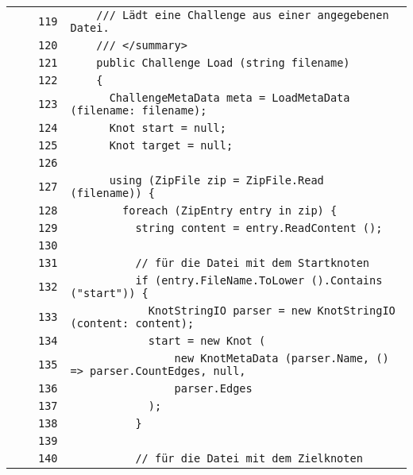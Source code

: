 \documentclass[a4paper,10pt]{article}
\begin{document}
\begin{longtable}[l]{lrrl}
\cellcolor{gray} &  & \verb~119~ & \verb~    /// Lädt eine Challenge aus einer angegebenen Datei.~\\
\cellcolor{gray} &  & \verb~120~ & \verb~    /// </summary>~\\
\cellcolor{gray} &  & \verb~121~ & \verb~    public Challenge Load (string filename)~\\
\cellcolor{gray} &  & \verb~122~ & \verb~    {~\\
\cellcolor{gray} &  & \verb~123~ & \verb~      ChallengeMetaData meta = LoadMetaData (filename: filename);~\\
\cellcolor{gray} &  & \verb~124~ & \verb~      Knot start = null;~\\
\cellcolor{gray} &  & \verb~125~ & \verb~      Knot target = null;~\\
\cellcolor{gray} &  & \verb~126~ & \verb~~\\
\cellcolor{gray} &  & \verb~127~ & \verb~      using (ZipFile zip = ZipFile.Read (filename)) {~\\
\cellcolor{gray} &  & \verb~128~ & \verb~        foreach (ZipEntry entry in zip) {~\\
\cellcolor{gray} &  & \verb~129~ & \verb~          string content = entry.ReadContent ();~\\
\cellcolor{gray} &  & \verb~130~ & \verb~~\\
\cellcolor{gray} &  & \verb~131~ & \verb~          // für die Datei mit dem Startknoten~\\
\cellcolor{gray} &  & \verb~132~ & \verb~          if (entry.FileName.ToLower ().Contains ("start")) {~\\
\cellcolor{gray} &  & \verb~133~ & \verb~            KnotStringIO parser = new KnotStringIO (content: content);~\\
\cellcolor{gray} &  & \verb~134~ & \verb~            start = new Knot (~\\
\cellcolor{gray} &  & \verb~135~ & \verb~                new KnotMetaData (parser.Name, () => parser.CountEdges, null, ~\\
\cellcolor{gray} &  & \verb~136~ & \verb~                parser.Edges~\\
\cellcolor{gray} &  & \verb~137~ & \verb~            );~\\
\cellcolor{gray} &  & \verb~138~ & \verb~          }~\\
\cellcolor{gray} &  & \verb~139~ & \verb~~\\
\cellcolor{gray} &  & \verb~140~ & \verb~          // für die Datei mit dem Zielknoten~\\

\end{longtable}
\end{document}
